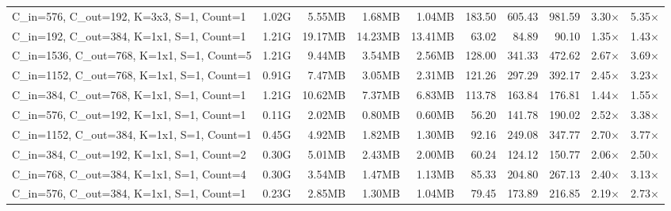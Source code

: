 \begin{table}[h]
\begin{tabular}{lrrrrrrrrr}
    C\_in=576, C\_out=192, K=3x3, S=1, Count=1 & 1.02G & 5.55MB & 1.68MB & 1.04MB & 183.50 & 605.43 & 981.59 & 3.30$\times$ & 5.35$\times$ \\
    C\_in=192, C\_out=384, K=1x1, S=1, Count=1 & 1.21G & 19.17MB & 14.23MB & 13.41MB & 63.02 & 84.89 & 90.10 & 1.35$\times$ & 1.43$\times$ \\
    C\_in=1536, C\_out=768, K=1x1, S=1, Count=5 & 1.21G & 9.44MB & 3.54MB & 2.56MB & 128.00 & 341.33 & 472.62 & 2.67$\times$ & 3.69$\times$ \\
    C\_in=1152, C\_out=768, K=1x1, S=1, Count=1 & 0.91G & 7.47MB & 3.05MB & 2.31MB & 121.26 & 297.29 & 392.17 & 2.45$\times$ & 3.23$\times$ \\
    C\_in=384, C\_out=768, K=1x1, S=1, Count=1 & 1.21G & 10.62MB & 7.37MB & 6.83MB & 113.78 & 163.84 & 176.81 & 1.44$\times$ & 1.55$\times$ \\
    C\_in=576, C\_out=192, K=1x1, S=1, Count=1 & 0.11G & 2.02MB & 0.80MB & 0.60MB & 56.20 & 141.78 & 190.02 & 2.52$\times$ & 3.38$\times$ \\
    C\_in=1152, C\_out=384, K=1x1, S=1, Count=1 & 0.45G & 4.92MB & 1.82MB & 1.30MB & 92.16 & 249.08 & 347.77 & 2.70$\times$ & 3.77$\times$ \\
    C\_in=384, C\_out=192, K=1x1, S=1, Count=2 & 0.30G & 5.01MB & 2.43MB & 2.00MB & 60.24 & 124.12 & 150.77 & 2.06$\times$ & 2.50$\times$ \\
    C\_in=768, C\_out=384, K=1x1, S=1, Count=4 & 0.30G & 3.54MB & 1.47MB & 1.13MB & 85.33 & 204.80 & 267.13 & 2.40$\times$ & 3.13$\times$ \\
    C\_in=576, C\_out=384, K=1x1, S=1, Count=1 & 0.23G & 2.85MB & 1.30MB & 1.04MB & 79.45 & 173.89 & 216.85 & 2.19$\times$ & 2.73$\times$ \\
    \bottomrule
  \end{tabular}
\end{table}
